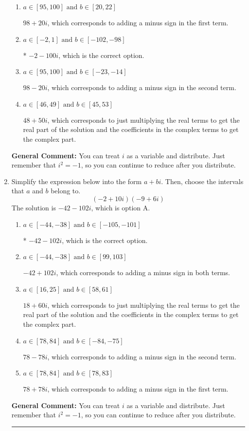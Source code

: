 \documentclass{extbook}[14pt]
\newcommand{\litem}[1]{\item #1

\rule{\textwidth}{0.4pt}}
\begin{document}
\begin{enumerate}
{\begin{enumerate}[label=\Alph*.]
 $-2 + 100 i$, which corresponds to adding a minus sign in both terms.
\item \( a \in [95, 100] \text{ and } b \in [20, 22] \)

 $98 + 20 i$, which corresponds to adding a minus sign in the first term.
\item \( a \in [-2, 1] \text{ and } b \in [-102, -98] \)

* $-2 - 100 i$, which is the correct option.
\item \( a \in [95, 100] \text{ and } b \in [-23, -14] \)

 $98 - 20 i$, which corresponds to adding a minus sign in the second term.
\item \( a \in [46, 49] \text{ and } b \in [45, 53] \)

 $48 + 50 i$, which corresponds to just multiplying the real terms to get the real part of the solution and the coefficients in the complex terms to get the complex part.
\end{enumerate}

\textbf{General Comment:} You can treat $i$ as a variable and distribute. Just remember that $i^2=-1$, so you can continue to reduce after you distribute.
}
\litem{
Simplify the expression below into the form $a+bi$. Then, choose the intervals that $a$ and $b$ belong to.
\[ (-2 + 10 i)(-9 + 6 i) \]The solution is \( -42 - 102 i \), which is option A.\begin{enumerate}[label=\Alph*.]
\item \( a \in [-44, -38] \text{ and } b \in [-105, -101] \)

* $-42 - 102 i$, which is the correct option.
\item \( a \in [-44, -38] \text{ and } b \in [99, 103] \)

 $-42 + 102 i$, which corresponds to adding a minus sign in both terms.
\item \( a \in [16, 25] \text{ and } b \in [58, 61] \)

 $18 + 60 i$, which corresponds to just multiplying the real terms to get the real part of the solution and the coefficients in the complex terms to get the complex part.
\item \( a \in [78, 84] \text{ and } b \in [-84, -75] \)

 $78 - 78 i$, which corresponds to adding a minus sign in the second term.
\item \( a \in [78, 84] \text{ and } b \in [78, 83] \)

 $78 + 78 i$, which corresponds to adding a minus sign in the first term.
\end{enumerate}

\textbf{General Comment:} You can treat $i$ as a variable and distribute. Just remember that $i^2=-1$, so you can continue to reduce after you distribute.
}
\end{enumerate}
\end{document}
